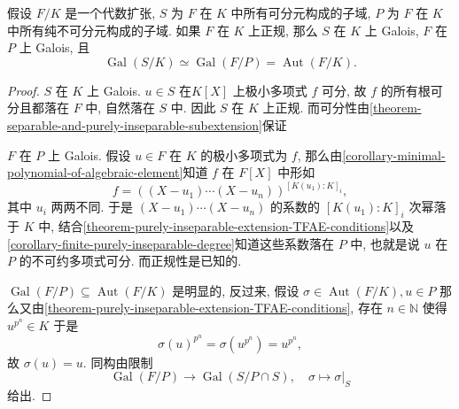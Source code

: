 \begin{corollary}
  假设 \( F/K \) 是一个代数扩张, \( S \) 为 \( F \) 在 \( K \)
  中所有可分元构成的子域, \( P \) 为 \( F \) 在 \( K \)
  中所有纯不可分元构成的子域.
  如果 \( F \) 在 \( K \) 上正规, 那么 \( S \) 在 \( K \) 上 Galois, \( F \) 在
  \( P \) 上 Galois, 且
  \[
    \operatorname{Gal}(S/K) \simeq \operatorname{Gal}(F/P) =
    \operatorname{Aut}(F/K).
  \]
\end{corollary}
\begin{proof}
  \( S \) 在 \( K \) 上 Galois.
  \( u \in S \) 在\( K[X] \) 上极小多项式 \( f \) 可分, 故 \( f \)
  的所有根可分且都落在 \( F \) 中, 自然落在 \( S \) 中. 因此 \( S \) 在 \( K \)
  上正规.
  而可分性由\cref{theorem-separable-and-purely-inseparable-subextension}保证

  \( F \) 在 \( P \) 上 Galois.
  假设 \( u \in F \) 在 \( K \) 的极小多项式为 \( f \),
  那么由\cref{corollary-minimal-polynomial-of-algebraic-element}知道 \( f \)
  在 \( F[X] \) 中形如
  \[
    f = ((X - u_1)\cdots (X - u_n))^{[K(u_1):K]_i},
  \]
  其中 \( u_i \) 两两不同.
  于是 \( (X - u_1) \cdots (X - u_n) \) 的系数的 \( [K(u_1): K]_i \) 次幂落于 \(
  K \) 中,
  结合\cref{theorem-purely-inseparable-extension-TFAE-conditions}以及\cref{corollary-finite-purely-inseparable-degree}知道这些系数落在
  \( P \) 中, 也就是说 \( u \) 在 \( P \) 的不可约多项式可分.
  而正规性是已知的.

  \( \operatorname{Gal}(F/P) \subseteq \operatorname{Aut}(F/K) \) 是明显的,
  反过来, 假设 \( \sigma \in \operatorname{Aut}(F/K), u \in P \)
  那么又由\cref{theorem-purely-inseparable-extension-TFAE-conditions}, 存在 \( n
  \in \mathbb{N} \) 使得 \( u^{p^n} \in K \) 于是
  \[
    \sigma(u)^{p^n} = \sigma(u^{p^n}) = u^{p^n},
  \]
  故 \( \sigma(u) = u \).
  同构由限制
  \[
    \operatorname{Gal}(F/P) \to \operatorname{Gal}(S/P \cap S),\quad \sigma
    \mapsto \left. \sigma \right\vert_{S}
  \]
  给出.
\end{proof}

